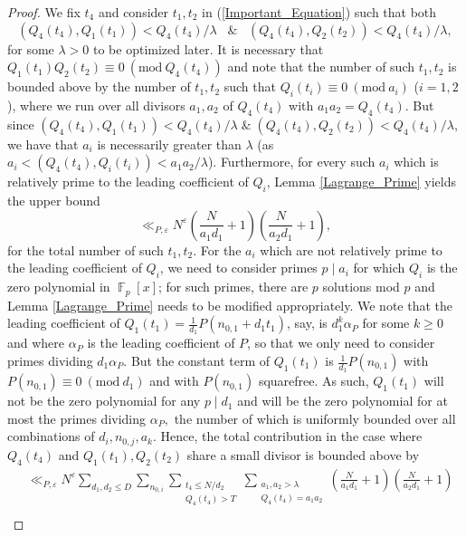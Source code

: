 \documentclass[11pts]{amsart}
\numberwithin{equation}{section}
\DeclareMathOperator{\F}{\mathbb{F}}
\newcommand{\Mod}[1]{\ (\text{mod}\ #1)}
\begin{document}
\begin{proof}
            We fix $t_4$ and consider $t_1,t_2$ in (\ref{Important_Equation}) such that both
            $$(Q_4(t_4),Q_1(t_1))<Q_4(t_4)/\lambda\;\;\;\&\;\;\;(Q_4(t_4),Q_2(t_2))<Q_4(t_4)/\lambda,$$
            for some $\lambda>0$ to be optimized later. It is necessary that $Q_1(t_1)Q_2(t_2)\equiv 0\Mod{Q_4(t_4)}$ and note that the number of such $t_1,t_2$ is bounded above by the number of $t_1,t_2$ such that $Q_i(t_i)\equiv 0\Mod{a_i}$ ($i=1,2$), where we run over all divisors $a_1,a_2$ of $Q_4(t_4)$ with $a_1a_2=Q_4(t_4)$. But since $(Q_4(t_4),Q_1(t_1))<Q_4(t_4)/\lambda\;\&\;(Q_4(t_4),Q_2(t_2))<Q_4(t_4)/\lambda$, we have that $a_i$ is necessarily greater than $\lambda$ (as $a_i<(Q_4(t_4),Q_i(t_i))<a_1a_2/\lambda$). Furthermore, for every such $a_i$ which is relatively prime to the leading coefficient of $Q_i$, Lemma \ref{Lagrange_Prime} yields the upper bound
            \[
            \ll_{P,\varepsilon} N^\varepsilon \left(\frac{N}{a_1d_1}+1\right)
            \left(\frac{N}{a_2d_1}+1\right),
            \]
            for the total number of such $t_1,t_2$. For the $a_i$ which are not relatively prime to the leading coefficient of $Q_i$, we need to consider primes $p\mid a_i$ for which $Q_i$ is the zero polynomial in $\F_p[x]$; for such primes, there are $p$ solutions mod $p$ and Lemma \ref{Lagrange_Prime} needs to be modified appropriately. We note that the leading coefficient of $Q_1(t_1)=\frac{1}{d_1}P(n_{0,1}+d_1t_1)$, say, is $d_1^k\alpha_P$ for some $k\geq 0$ and where $\alpha_P$ is the leading coefficient of $P$, so that we only need to consider primes dividing $d_1\alpha_P$. But the constant term of $Q_1(t_1)$ is $\frac{1}{d_1}P(n_{0,1})$ with $P(n_{0,1})\equiv0\Mod{d_1}$ and with $P(n_{0,1})$ squarefree. As such, $Q_1(t_1)$ will not be the zero polynomial for any $p\mid d_1$ and will be the zero polynomial for at most the primes dividing $\alpha_P,$ the number of which is uniformly bounded over all combinations of $d_i,n_{0,j},a_k$. Hence, the total contribution in the case where $Q_4(t_4)$ and $Q_1(t_1),Q_2(t_2)$ share a small divisor is bounded above by
            \begin{align}
                &\ll_{P,\varepsilon}
                N^{\varepsilon}
                \sum_{d_1,d_2\leq D}
                \sum_{n_{0,i}}\sum_{\substack{{t_4\leq N/d_2}\\{Q_4(t_4)>T}}}
                \sum_{\substack{{a_1,a_2>\lambda}\\{Q_4(t_4)=a_1a_2}}}
                \left(\frac{N}{a_1d_1}+1\right)
                \left(\frac{N}{a_2d_1}+1\right)\\

\end{align}
\end{proof}
\end{document}
